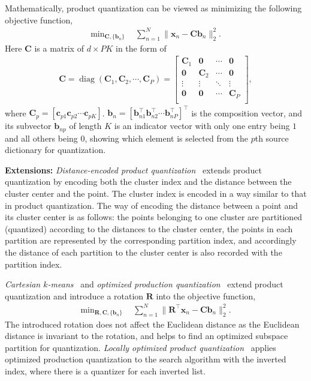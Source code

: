 \documentclass[10pt,journal,compsoc]{IEEEtran}
\begin{document}
Mathematically,
product quantization can be viewed
as minimizing the following objective function,
\begin{align}
\min\nolimits_{\mathbf{C}, \{\mathbf{b}_n\}} ~&~
\sum\nolimits_{n=1}^N \|\mathbf{x}_n - \mathbf{C}\mathbf{b}_n\|_2^2.
\end{align}
Here $\mathbf{C}$ is a matrix of $d \times PK$
in the form of
\begin{align}
\mathbf{C} = \operatorname{diag}(\mathbf{C}_1, \mathbf{C}_2, \cdots, \mathbf{C}_P)
=
\begin{bmatrix}
\mathbf{C}_1 & \mathbf{0} &  \cdots &  \mathbf{0}  \\[0.3em]
\mathbf{0} &  \mathbf{C}_2 &  \cdots &  \mathbf{0}  \\[0.3em]
\vdots  & \vdots  & \ddots & \vdots   \\[0.3em]
\mathbf{0} &  \mathbf{0} &  \cdots &  \mathbf{C}_P   \\
\end{bmatrix}, \nonumber
\end{align}
where $\mathbf{C}_p = [\mathbf{c}_{p1} \mathbf{c}_{p2}\cdots \mathbf{c}_{pK}]$.
$\mathbf{b}_n = [\mathbf{b}_{n1}^\top \mathbf{b}_{n2}^\top \cdots \mathbf{b}_{nP}^\top]^\top$ is the composition vector,
and its subvector
$\mathbf{b}_{np}$
of length $K$
is an indicator vector
with only one entry being $1$
and all others being $0$,
showing which element is selected
from the $p$th source dictionary for quantization.




\textbf{Extensions:}
\emph{Distance-encoded product quantization}~\cite{HeoLY14}
extends product quantization
by encoding both the cluster index
and the distance between the cluster center and the point.
The cluster index is encoded in a way similar to that in product quantization.
The way
of encoding the distance between a point and its cluster center
is as follows:
the points belonging to one cluster
are partitioned (quantized)
according to the distances to the cluster center,
the points in each partition are represented
by the corresponding partition index,
and accordingly the distance of each partition to the cluster center is also recorded with the partition index.

\emph{Cartesian $k$-means}~\cite{NorouziF13}
and \emph{optimized production quantization}~\cite{GeHK013} extend product quantization
and introduce a rotation $\mathbf{R}$
into the objective function,
\begin{align}
\min\nolimits_{\mathbf{R}, \mathbf{C}, \{\mathbf{b}_n\}} ~&~
\sum\nolimits_{n=1}^N \|\mathbf{R}^\top\mathbf{x}_n - \mathbf{C}\mathbf{b}_n\|_2^2.
\end{align}
The introduced rotation does not
affect the Euclidean distance
as the Euclidean distance is invariant to the rotation,
and helps to find an optimized subspace partition
for quantization.
\emph{Locally optimized product quantization}~\cite{KalantidisA14}
applies optimized production quantization to the search algorithm
with the inverted index,
where there is a quantizer for each inverted list.
\end{document}
